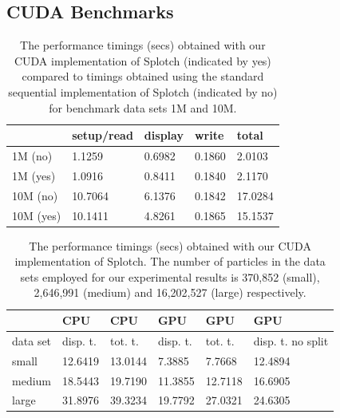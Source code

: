 \documentclass[1p,times]{elsarticle}
\begin{document}
\subsection{CUDA Benchmarks}

\begin{table}
\caption{The performance timings (secs) obtained with our CUDA implementation of Splotch (indicated by yes) compared to timings obtained using the standard sequential implementation of Splotch (indicated by no) for benchmark data sets 1M and 10M.}
\begin{center}
\begin{tabular}{|l|l|l|l|l|}
\hline
	& setup/read & 	display & 	write & 	total \\
\hline
1M (no) & 	1.1259 & 	0.6982 & 	0.1860 & 	2.0103 \\
\hline
1M (yes) & 	1.0916 & 	0.8411 & 	0.1840 & 	2.1170 \\
\hline
10M (no) & 	10.7064 & 	6.1376 & 	0.1842 & 	17.0284 \\
\hline
10M (yes) & 	10.1411 & 	4.8261 & 	0.1865 & 	15.1537 \\
\hline
\end{tabular}
\end{center}
\end{table}

\begin{table}
\caption{The performance timings (secs) obtained with our CUDA implementation of Splotch. 
The number of particles in the data sets employed for our experimental results is
370,852 (small), 2,646,991 (medium) and 16,202,527 (large) respectively.}

\begin{center}
\begin{tabular}{ | l || l | l || l | l | p{3cm} |}
\hline  
   &	CPU	& CPU	& GPU	& GPU	& GPU \\
\hline
  data set & disp. t. & tot. t. & disp. t. & tot. t. & disp. t. no split \\
\hline  
  small &	12.6419	& 13.0144	& 7.3885	& 7.7668	& 12.4894 \\
\hline
  medium &	18.5443 &	19.7190 &	11.3855 &	12.7118 &	16.6905 \\
\hline
  large	& 31.8976 &	39.3234 &	19.7792 &	27.0321	& 24.6305\\
\hline
\end{tabular}
\end{center}
\end{table}
\end{document}
